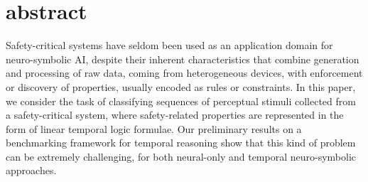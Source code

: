 \section{abstract}
	Safety-critical systems have seldom been used as an application domain for neuro-symbolic AI, despite their inherent characteristics that combine generation and processing of raw data, coming from heterogeneous devices, with enforcement or discovery of properties, usually encoded as rules or constraints. In this paper, we consider the task of classifying sequences of perceptual stimuli collected from a safety-critical system, where safety-related properties are represented in the form of linear temporal logic formulae. %
	Our preliminary results on a benchmarking framework for temporal reasoning show that this kind of problem can be extremely challenging, for both neural-only and temporal neuro-symbolic approaches.
\fi
\iffalse
